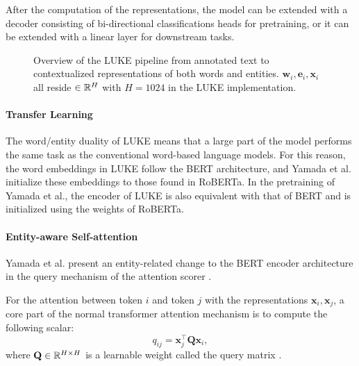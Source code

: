 \documentclass[main.tex]{subfiles}
\begin{document}
After the computation of the representations, the model can be extended with a decoder consisting of bi-directional classifications heads for pretraining, or it can be extended with a linear layer for downstream tasks.
\begin{figure}[H]
    \centering
        
    \caption{
        Overview of the LUKE pipeline from annotated text to contextualized representations of both words and entities.
        $\mathbf w_i, \mathbf e_i, \mathbf x_i$ all reside $\in \mathbb R^H$ with $H=1024$ in the LUKE implementation.
    }
    \label{fig:luke}
\end{figure}\noindent

\paragraph{Transfer Learning}
The word/entity duality of LUKE means that a large part of the model performs the same task as the conventional word-based language models.
For this reason, the word embeddings in LUKE follow the BERT architecture, and Yamada et al. initialize these embeddings to those found in RoBERTa.
In the pretraining of Yamada et al., the encoder of LUKE is also equivalent with that of BERT and is initialized using the weights of RoBERTa.


\paragraph{Entity-aware Self-attention}
\label{subsubsec:entityaware}
Yamada et al. present an entity-related change to the BERT encoder architecture in the query mechanism of the attention scorer \cite[Sec. 3.2]{yamada2020luke}.

For the attention between token $i$ and token $j$ with the representations $\mathbf x_i, \mathbf x_j$, a core part of the normal transformer attention mechanism is to compute the following scalar:
\begin{equation}
    q_{ij} = \mathbf x_j^\top \mathbf Q \mathbf x_i,
\end{equation}
where $\mathbf Q\in \mathbb R^{H\times H}$ is a learnable weight called the query matrix \cite[Sec. 3.2.1]{vaswani2017att}.
\end{document}
